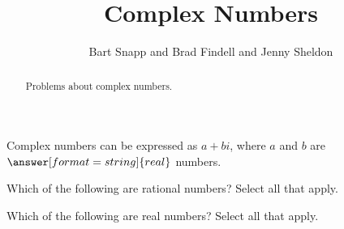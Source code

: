 \documentclass[nooutcomes]{ximera}
\title{Complex Numbers}
\author{Bart Snapp and Brad Findell and Jenny Sheldon}
\begin{document}
\begin{abstract}
Problems about complex numbers.
\end{abstract}
\maketitle



\begin{problem}
Complex numbers can be expressed as $a+bi$, where $a$ and $b$ are $\answer[format=string]{real}$ numbers.  
\end{problem}

\begin{problem}
Which of the following are rational numbers?  Select all that apply.

\begin{selectAll}
\end{selectAll}
\end{problem}



\begin{problem}
Which of the following are real numbers?  Select all that apply.

\begin{selectAll}
\end{selectAll}
\end{problem}
\end{document}
